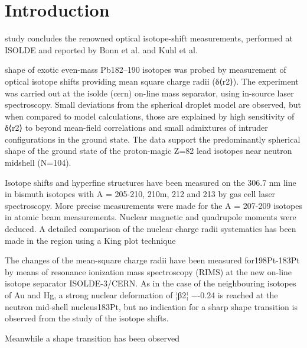 \section{Introduction} 




study concludes the renowned optical isotope-shift measurements, performed at ISOLDE and reported by Bonn et al. and Kuhl et al.

shape of exotic even-mass Pb182–190 isotopes was probed by measurement of optical isotope shifts providing mean square charge radii (δ⟨r2⟩). The experiment was carried out at the isolde (cern) on-line mass separator, using in-source laser spectroscopy. Small deviations from the spherical droplet model are observed, but when compared to model calculations, those are explained by high sensitivity of δ⟨r2⟩ to beyond mean-field correlations and small admixtures of intruder configurations in the ground state. The data support the predominantly spherical shape of the ground state of the proton-magic Z=82 lead isotopes near neutron midshell (N=104).


Isotope shifts and hyperfine structures have been measured on the 306.7 nm line in bismuth isotopes with A = 205-210, 210m, 212 and 213 by gas cell laser spectroscopy. More precise measurements were made for the A = 207-209 isotopes in atomic beam measurements. Nuclear magnetic and quadrupole moments were deduced. A detailed comparison of the nuclear charge radii systematics has been made in the region using a King plot technique

The changes of the mean-square charge radii have been measured for198Pt-183Pt by means of resonance ionization mass spectroscopy (RIMS) at the new on-line isotope separator ISOLDE-3/CERN. As in the case of the neighbouring isotopes of Au and Hg, a strong nuclear deformation of ¦β2¦ −-0.24 is reached at the neutron mid-shell nucleus183Pt, but no indication for a sharp shape transition is observed from the study of the isotope shifts.




Meanwhile a shape transition has been observed

